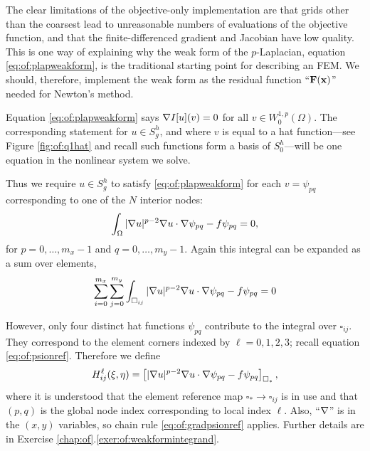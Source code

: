 The clear limitations of the objective-only implementation are that grids other than the coarsest lead to unreasonable numbers of evaluations of the objective function, and that the finite-differenced gradient and Jacobian have low quality.  This is one way of explaining why the weak form of the $p$-Laplacian, equation \eqref{eq:of:plapweakform}, is the traditional starting point for describing an FEM.  We should, therefore, implement the weak form as the residual function ``$\mathbf{F}(\mathbf{x})$'' needed for Newton's method.

Equation \eqref{eq:of:plapweakform} says $\nabla I[u](v) = 0$ for all $v\in W_0^{1,p}(\Omega)$.  The corresponding statement for $u\in S_g^h$, and where $v$ is equal to a hat function---see Figure \ref{fig:of:q1hat} and recall such functions form a basis of $S_0^h$---will be one equation in the nonlinear system we solve.

Thus we require $u\in S_g^h$ to satisfy \eqref{eq:of:plapweakform} for each $v=\psi_{pq}$ corresponding to one of the $N$ interior nodes:
\begin{equation}
\int_\Omega |\nabla u|^{p-2} \nabla u \cdot \nabla \psi_{pq} - f \psi_{pq} = 0, \label{eq:of:weakformbasis}
\end{equation}
for $p=0,\dots,m_x-1$ and $q=0,\dots,m_y-1$.  Again this integral can be expanded as a sum over elements,
\begin{equation}
\sum_{i=0}^{m_x} \sum_{j=0}^{m_y} \int_{\square_{ij}} |\nabla u|^{p-2} \nabla u \cdot \nabla \psi_{pq} - f \psi_{pq} = 0 \label{eq:of:residualsumoverelements}
\end{equation}


However, only four distinct hat functions $\psi_{pq}$ contribute to the integral over $\square_{ij}$.  They correspond to the element corners indexed by $\ell=0,1,2,3$; recall equation \eqref{eq:of:psionref}.  Therefore we define
\begin{equation}
H_{ij}^\ell(\xi,\eta) = \left[|\nabla u|^{p-2} \nabla u \cdot \nabla \psi_{pq} - f \psi_{pq}\right]_{\square_\ast}, \label{eq:of:weakformintegrandref}
\end{equation}
where it is understood that the element reference map $\square_\ast \to \square_{ij}$ is in use and that $(p,q)$ is the global node index corresponding to local index $\ell$.  Also, ``$\nabla$'' is in the $(x,y)$ variables, so chain rule \eqref{eq:of:gradpsionref} applies.  Further details are in Exercise \ref{chap:of}.\ref{exer:of:weakformintegrand}.

